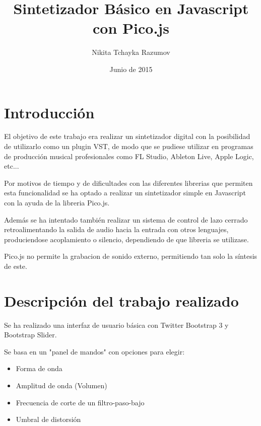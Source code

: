 \documentclass[a4paper]{article}
\begin{document}
    \title{Sintetizador Básico en Javascript con Pico.js}
    \author{Nikita Tchayka Razumov}
    \date{Junio de 2015}
    \maketitle

    \newpage
    \tableofcontents
    \newpage

    \section{Introducción}
        El objetivo de este trabajo era realizar un sintetizador
        digital con la posibilidad de utilizarlo como un plugin VST,
        de modo que se pudiese utilizar en programas de producción
        musical profesionales como FL Studio, Ableton Live, Apple Logic,
        etc...

        Por motivos de tiempo y de dificultades con las diferentes
        librerias que permiten esta funcionalidad se ha optado a realizar
        un sintetizador simple en Javascript con la ayuda de la libreria
        Pico.js.

        Además se ha intentado también realizar un sistema de control
        de lazo cerrado retroalimentando la salida de audio hacia la
        entrada con otros lenguajes, produciendose acoplamiento o
        silencio, dependiendo de que libreria se utilizase.

        Pico.js no permite la grabacion de sonido externo, permitiendo
        tan solo la síntesis de este.
        \newpage

    \section{Descripción del trabajo realizado}
        Se ha realizado una interfaz de usuario básica con Twitter
        Bootstrap 3 y Bootstrap Slider.

        Se basa en un "panel de mandos" con opciones para elegir:
        \begin{itemize}
            \item Forma de onda
            \item Amplitud de onda (Volumen)
            \item Frecuencia de corte de un filtro-paso-bajo
            \item Umbral de distorsión
        \end{itemize}
\end{document}
